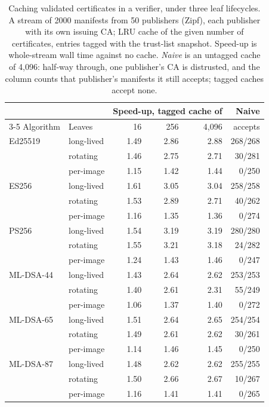 \begin{table}[ht]
\caption{Caching validated certificates in a verifier, under three leaf lifecycles. A stream of 2000 manifests from 50 publishers (Zipf), each publisher with its own issuing CA; LRU cache of the given number of certificates, entries tagged with the trust-list snapshot. Speed-up is whole-stream wall time against no cache. \emph{Naive} is an untagged cache of 4,096: half-way through, one publisher's CA is distrusted, and the column counts that publisher's manifests it still accepts; tagged caches accept none.}
\label{tab:cache}
\small
\setlength{\tabcolsep}{3.5pt}
\begin{tabular}{llrrrr}
\toprule
 & & \multicolumn{3}{c}{Speed-up, tagged cache of} & Naive\\
\cmidrule(lr){3-5}
Algorithm & Leaves & 16 & 256 & 4,096 & accepts\\
\midrule
Ed25519 & long-lived & 1.49 & 2.86 & 2.88 & 268/268\\
 & rotating & 1.46 & 2.75 & 2.71 & 30/281\\
 & per-image & 1.15 & 1.42 & 1.44 & 0/250\\
\midrule
ES256 & long-lived & 1.61 & 3.05 & 3.04 & 258/258\\
 & rotating & 1.53 & 2.89 & 2.71 & 40/262\\
 & per-image & 1.16 & 1.35 & 1.36 & 0/274\\
\midrule
PS256 & long-lived & 1.54 & 3.19 & 3.19 & 280/280\\
 & rotating & 1.55 & 3.21 & 3.18 & 24/282\\
 & per-image & 1.24 & 1.43 & 1.46 & 0/247\\
\midrule
ML-DSA-44 & long-lived & 1.43 & 2.64 & 2.62 & 253/253\\
 & rotating & 1.40 & 2.61 & 2.31 & 55/249\\
 & per-image & 1.06 & 1.37 & 1.40 & 0/272\\
\midrule
ML-DSA-65 & long-lived & 1.51 & 2.64 & 2.65 & 254/254\\
 & rotating & 1.49 & 2.61 & 2.62 & 30/261\\
 & per-image & 1.14 & 1.46 & 1.45 & 0/250\\
\midrule
ML-DSA-87 & long-lived & 1.48 & 2.62 & 2.62 & 255/255\\
 & rotating & 1.50 & 2.66 & 2.67 & 10/267\\
 & per-image & 1.16 & 1.41 & 1.41 & 0/265\\
\bottomrule
\end{tabular}
\end{table}
